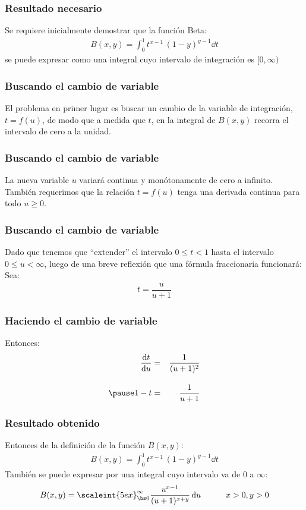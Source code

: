 \documentclass[12pt]{beamer}
\begin{document}
\begin{frame}
\frametitle{Resultado necesario}
Se requiere inicialmente demostrar que la función Beta:
\begin{align*}
B(x, y) = \int_{0}^{1} t^{x - 1} \, (1 - y)^{y-1} \dd{t}
\end{align*}
\pause
se puede expresar como una integral cuyo intervalo de integración es $[0, \infty)$
\end{frame}
\begin{frame}
\frametitle{Buscando el cambio de variable}
El problema en primer lugar es buscar un cambio de la variable de integración, \pause $t = f(u)$, \pause de modo que a medida que $t$, en la integral de $B (x, y)$ recorra el intervalo de cero a la unidad.
\end{frame}
\begin{frame}
\frametitle{Buscando el cambio de variable}
La nueva variable $u$ variará continua y monótonamente de cero a infinito.
\\
\bigskip
\pause
También requerimos que la relación $t = f(u)$ tenga una derivada continua para todo $u \geq 0$.
\end{frame}
\begin{frame}
\frametitle{Buscando el cambio de variable}
Dado que tenemos que \enquote{extender} el intervalo $0 \leq t < 1$ hasta el intervalo $0 \leq u < \infty$, \pause luego de una breve reflexión que una fórmula fraccionaria funcionará:
\pause
Sea:
\begin{align*}
t = \dfrac{u}{u + 1}
\end{align*}
\end{frame}
\begin{frame}
\frametitle{Haciendo el cambio de variable}
Entonces:
\pause
\begin{eqnarray*}
\dv{t}{u} &=& \dfrac{1}{(u + 1)^{2}} \\[1em] \pause
1 - t &=& \dfrac{1}{u + 1}
\end{eqnarray*}
\end{frame}
\begin{frame}
\frametitle{Resultado obtenido}
Entonces de la definición de la función $B(x, y)$:
\pause
\begin{align*}
B(x, y) = \int_{0}^{1} t^{x - 1} \, (1 - y)^{y-1} \dd{t}
\end{align*}
\pause
También se puede expresar por una integral cuyo intervalo va de $0$ a  $\infty$:
\begin{align*}
B(x, y) = \scaleint{5ex}_{\bs 0}^{\infty} \dfrac{u^{x-1}}{(u + 1)^{x+y}} \dd{u} \hspace{1cm} x > 0, y > 0
\end{align*}
\end{frame}
\end{document}
